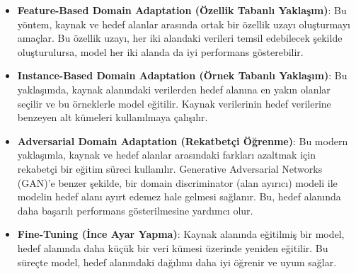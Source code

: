 \begin{itemize}
    \item \textbf{Feature-Based Domain Adaptation (Özellik Tabanlı Yaklaşım)}: Bu yöntem, kaynak ve hedef alanlar arasında ortak bir özellik uzayı oluşturmayı amaçlar. Bu özellik uzayı, her iki alandaki verileri temsil edebilecek şekilde oluşturulursa, model her iki alanda da iyi performans gösterebilir.
    \item \textbf{Instance-Based Domain Adaptation (Örnek Tabanlı Yaklaşım)}: Bu yaklaşımda, kaynak alanındaki verilerden hedef alanına en yakın olanlar seçilir ve bu örneklerle model eğitilir. Kaynak verilerinin hedef verilerine benzeyen alt kümeleri kullanılmaya çalışılır.
    \item \textbf{Adversarial Domain Adaptation (Rekatbetçi Öğrenme)}: Bu modern yaklaşımla, kaynak ve hedef alanlar arasındaki farkları azaltmak için rekabetçi bir eğitim süreci kullanılır. Generative Adversarial Networks (GAN)'e benzer şekilde, bir domain discriminator (alan ayırıcı) modeli ile modelin hedef alanı ayırt edemez hale gelmesi sağlanır. Bu, hedef alanında daha başarılı performans gösterilmesine yardımcı olur.
    \item \textbf{Fine-Tuning (İnce Ayar Yapma)}: Kaynak alanında eğitilmiş bir model, hedef alanında daha küçük bir veri kümesi üzerinde yeniden eğitilir. Bu süreçte model, hedef alanındaki dağılımı daha iyi öğrenir ve uyum sağlar.
\end{itemize}

\newpage